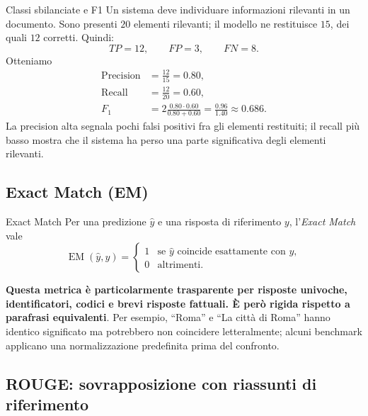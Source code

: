 \begin{example}{Classi sbilanciate e F1}
Un sistema deve individuare informazioni rilevanti in un documento. Sono presenti $20$ elementi rilevanti; il modello ne restituisce $15$, dei quali $12$ corretti. Quindi:
\begin{equation}
TP=12,\qquad FP=3,\qquad FN=8.
\end{equation}
Otteniamo
\begin{align}
\operatorname{Precision}&=\frac{12}{15}=0.80,\\
\operatorname{Recall}&=\frac{12}{20}=0.60,\\
F_1&=2\frac{0.80\cdot0.60}{0.80+0.60}
=\frac{0.96}{1.40}\approx0.686.
\end{align}
La precision alta segnala pochi falsi positivi fra gli elementi restituiti; il recall più basso mostra che il sistema ha perso una parte significativa degli elementi rilevanti.
\end{example}

\subsection{Exact Match (EM)}

\begin{definition}{Exact Match}
Per una predizione $\widehat y$ e una risposta di riferimento $y$, l'\emph{Exact Match} vale
\begin{equation}
\operatorname{EM}(\widehat y,y)=
\begin{cases}
1 & \text{se }\widehat y\text{ coincide esattamente con }y,\\
0 & \text{altrimenti}.
\end{cases}
\end{equation}
\end{definition}

\textbf{Questa metrica è particolarmente trasparente per risposte univoche, identificatori, codici e brevi risposte fattuali. È però rigida rispetto a parafrasi equivalenti}. Per esempio, ``Roma'' e ``La città di Roma'' hanno identico significato ma potrebbero non coincidere letteralmente; alcuni benchmark applicano una normalizzazione predefinita prima del confronto.

\subsection{ROUGE: sovrapposizione con riassunti di riferimento}

